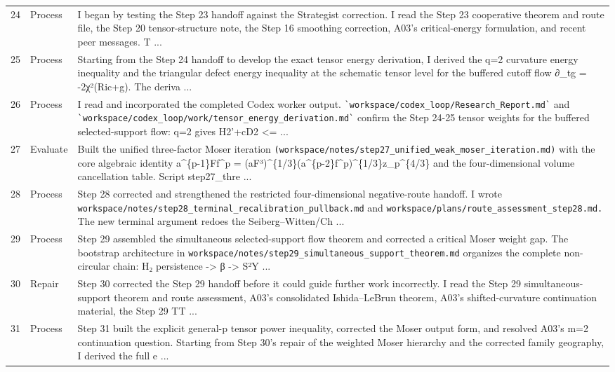 \documentclass[UTF8,fontset=fandol,zihao=-4]{ctexart}
\begin{document}
\begin{longtable}{r p{} >{\raggedright\arraybackslash}p{}}
24 & Process & I began by testing the Step 23 handoff against the Strategist correction. I read the Step 23 cooperative theorem and route file, the Step 20 tensor-structure note, the Step 16 smoothing correction, A03's critical-energy formulation, and recent peer messages. T ...\\
25 & Process & Starting from the Step 24 handoff to develop the exact tensor energy derivation, I derived the q=2 curvature energy inequality and the triangular defect energy inequality at the schematic tensor level for the buffered cutoff flow ∂\_tg = -2χ²(Ric+g). The deriva ...\\
26 & Process & I read and incorporated the completed Codex worker output. \nolinkurl{`workspace/codex_loop/Research_Report.md`} and \nolinkurl{`workspace/codex_loop/work/tensor_energy_derivation.md`} confirm the Step 24-25 tensor weights for the buffered selected-support flow: q=2 gives H2'+cD2 <=  ...\\
27 & Evaluate & Built the unified three-factor Moser iteration \nolinkurl{(workspace/notes/step27_unified_weak_moser_iteration.md)} with the core algebraic identity a\textasciicircum{}\{p-1\}Ff\textasciicircum{}p = (aF³)\textasciicircum{}\{1/3\}(a\textasciicircum{}\{p-2\}f\textasciicircum{}p)\textasciicircum{}\{1/3\}z\_p\textasciicircum{}\{4/3\} and the four-dimensional volume cancellation table. Script step27\_thre ...\\
28 & Process & Step 28 corrected and strengthened the restricted four-dimensional negative-route handoff. I wrote \nolinkurl{workspace/notes/step28_terminal_recalibration_pullback.md} and \nolinkurl{workspace/plans/route_assessment_step28.md.} The new terminal argument redoes the Seiberg--Witten/Ch ...\\
29 & Process & Step 29 assembled the simultaneous selected-support flow theorem and corrected a critical Moser weight gap. The bootstrap architecture in \nolinkurl{workspace/notes/step29_simultaneous_support_theorem.md} organizes the complete non-circular chain: H₂ persistence  ->  β  ->  S²Y ...\\
30 & Repair & Step 30 corrected the Step 29 handoff before it could guide further work incorrectly. I read the Step 29 simultaneous-support theorem and route assessment, A03's consolidated Ishida--LeBrun theorem, A03's shifted-curvature continuation material, the Step 29 TT ...\\
31 & Process & Step 31 built the explicit general-p tensor power inequality, corrected the Moser output form, and resolved A03's m=2 continuation question. Starting from Step 30's repair of the weighted Moser hierarchy and the corrected family geography, I derived the full e ...\\

\end{longtable}
\end{document}
